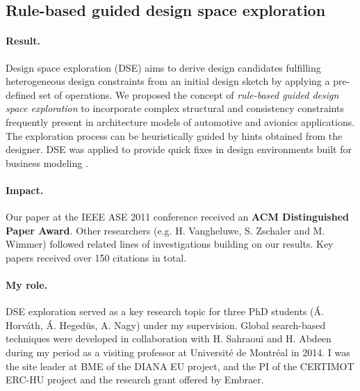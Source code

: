 \subsection{Rule-based guided design space exploration}

\paragraph{Result.}
Design space exploration (DSE) aims to derive design candidates fulfilling heterogeneous design constraints from an initial design sketch by applying a pre-defined set of operations. We proposed the concept of \emph{rule-based guided design space exploration} \cite{Horvath-models09,sosym2011-csp,ase2011-dse,ause2015,ase2014,mpm2014} to incorporate complex structural and consistency constraints frequently present in architecture models of automotive and avionics applications. The exploration process can be heuristically guided by hints obtained from the designer. DSE was applied to provide quick fixes in design environments built for business modeling \cite{vlhcc2011}. 

\paragraph{Impact.} 
Our paper \cite{ase2011-dse} at the IEEE ASE 2011 conference received an \textbf{ACM Distinguished Paper Award}. Other researchers (e.g. H. Vangheluwe, S. Zschaler and M. Wimmer) followed related lines of investigations building on our results. Key papers \cite{Horvath-models09,sosym2011-csp,ase2011-dse,ause2015,ase2014} received over 150 citations in total. 

\paragraph{My role.} 
DSE exploration served as a key research topic for three PhD students (Á. Horváth, Á. Hegedüs, A. Nagy) under my supervision. Global search-based techniques were developed in collaboration with H. Sahraoui and H. Abdeen \cite{ase2014} during my period as a visiting professor at Université de Montréal in 2014. I was the site leader at BME of the DIANA EU project, and the PI of the CERTIMOT ERC-HU project and the research grant offered by Embraer.


